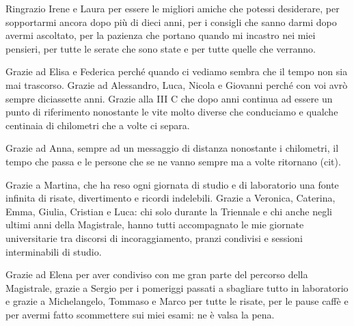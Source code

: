 Ringrazio Irene e Laura per essere le migliori amiche che potessi desiderare, per sopportarmi ancora dopo più di dieci anni, per i consigli che sanno darmi dopo avermi ascoltato, per la pazienza che portano quando mi incastro nei miei pensieri, per tutte le serate che sono state e per tutte quelle che verranno.

Grazie ad Elisa e Federica perché quando ci vediamo sembra che il tempo non sia mai trascorso. Grazie ad Alessandro, Luca, Nicola e Giovanni perché con voi avrò sempre diciassette anni. Grazie alla III C che dopo anni continua ad essere un punto di riferimento nonostante le vite molto diverse che conduciamo e qualche centinaia di chilometri che a volte ci separa.

Grazie ad Anna, sempre ad un messaggio di distanza nonostante i chilometri, il tempo che passa e le persone che se ne vanno sempre ma a volte ritornano (cit).

Grazie a Martina, che ha reso ogni giornata di studio e di laboratorio una fonte infinita di risate, divertimento e ricordi indelebili. Grazie a Veronica, Caterina, Emma, Giulia, Cristian e Luca: chi solo durante la Triennale e chi anche negli ultimi anni della Magistrale, hanno tutti accompagnato le mie giornate universitarie tra discorsi di incoraggiamento, pranzi condivisi e sessioni interminabili di studio.

Grazie ad Elena per aver condiviso con me gran parte del percorso della Magistrale, grazie a Sergio per i pomeriggi passati a sbagliare tutto in laboratorio e grazie a Michelangelo, Tommaso e Marco per tutte le risate, per le pause caffè e per avermi fatto scommettere sui miei esami: ne è valsa la pena.